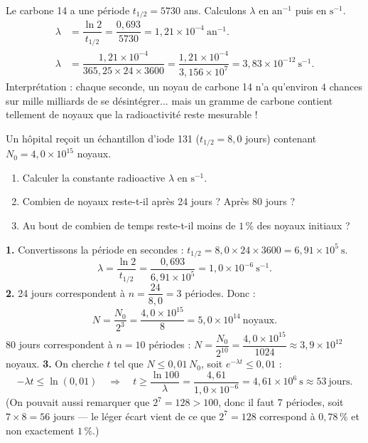 \documentclass[11pt]{article}
\begin{document}
\begin{exemplebox}
Le carbone 14 a une période $t_{1/2} = 5730$ ans. Calculons $\lambda$ en $\mathrm{an^{-1}}$ puis en $\mathrm{s^{-1}}$.
\begin{align*}
\lambda &= \dfrac{\ln 2}{t_{1/2}} = \dfrac{0{,}693}{5730} = 1{,}21\times 10^{-4}\ \mathrm{an^{-1}}.\\
\lambda &= \dfrac{1{,}21\times 10^{-4}}{365{,}25\times 24\times 3600} = \dfrac{1{,}21\times 10^{-4}}{3{,}156\times 10^{7}} = 3{,}83\times 10^{-12}\ \mathrm{s^{-1}}.
\end{align*}
Interprétation : chaque seconde, un noyau de carbone 14 n'a qu'environ $4$ chances sur mille milliards de se désintégrer... mais un gramme de carbone contient tellement de noyaux que la radioactivité reste mesurable !
\end{exemplebox}

\begin{exoresolu}
Un hôpital reçoit un échantillon d'iode 131 ($t_{1/2} = 8{,}0$ jours) contenant $N_0 = 4{,}0\times 10^{15}$ noyaux.
\begin{enumerate}
\item Calculer la constante radioactive $\lambda$ en $\mathrm{s^{-1}}$.
\item Combien de noyaux reste-t-il après 24 jours ? Après 80 jours ?
\item Au bout de combien de temps reste-t-il moins de $1\,\%$ des noyaux initiaux ?
\end{enumerate}
\tcblower
\textbf{1.} Convertissons la période en secondes : $t_{1/2} = 8{,}0\times 24\times 3600 = 6{,}91\times 10^{5}\ \mathrm{s}$.
\[ \lambda = \dfrac{\ln 2}{t_{1/2}} = \dfrac{0{,}693}{6{,}91\times 10^{5}} = 1{,}0\times 10^{-6}\ \mathrm{s^{-1}}. \]
\textbf{2.} 24 jours correspondent à $n = \dfrac{24}{8{,}0} = 3$ périodes. Donc :
\[ N = \dfrac{N_0}{2^3} = \dfrac{4{,}0\times 10^{15}}{8} = 5{,}0\times 10^{14}\ \text{noyaux}. \]
80 jours correspondent à $n = 10$ périodes : $N = \dfrac{N_0}{2^{10}} = \dfrac{4{,}0\times 10^{15}}{1024} \approx 3{,}9\times 10^{12}$ noyaux.
\textbf{3.} On cherche $t$ tel que $N \leq 0{,}01\,N_0$, soit $e^{-\lambda t} \leq 0{,}01$ :
\[ -\lambda t \leq \ln(0{,}01) \quad\Longrightarrow\quad t \geq \dfrac{\ln 100}{\lambda} = \dfrac{4{,}61}{1{,}0\times 10^{-6}} = 4{,}61\times 10^{6}\ \mathrm{s} \approx 53\ \text{jours}. \]
(On pouvait aussi remarquer que $2^7 = 128 > 100$, donc il faut 7 périodes, soit $7\times 8 = 56$ jours — le léger écart vient de ce que $2^7 = 128$ correspond à $0{,}78\,\%$ et non exactement $1\,\%$.)
\end{exoresolu}
\end{document}
